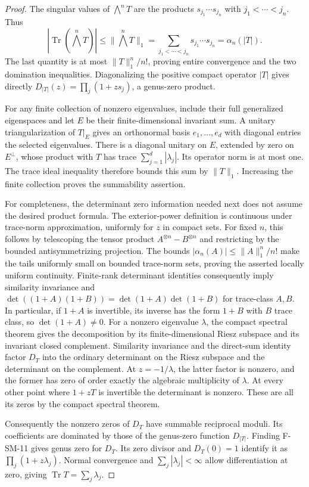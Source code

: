 \begin{proof}
The singular values of $\bigwedge^nT$ are the products
$s_{j_1}\cdots s_{j_n}$ with $j_1<\cdots<j_n$.  Thus
\[
 |\operatorname{Tr}(\bigwedge^nT)|
 \leq\|\bigwedge^nT\|_1
 =\sum_{j_1<\cdots<j_n}s_{j_1}\cdots s_{j_n}
 =\alpha_n(|T|).
\]
The last quantity is at most $\|T\|_1^n/n!$, proving entire convergence
and the two domination inequalities.  Diagonalizing the positive compact
operator $|T|$ gives directly
$D_{|T|}(z)=\prod_j(1+zs_j)$, a genus-zero product.

For any finite collection of nonzero eigenvalues, include their full
generalized eigenspaces and let $E$ be their finite-dimensional invariant
sum.  A unitary triangularization of $T|_E$ gives an orthonormal basis
$e_1,\ldots,e_d$ with diagonal entries the selected eigenvalues.  There is
a diagonal unitary on $E$, extended by zero on $E^\perp$, whose product
with $T$ has trace $\sum_{j=1}^d|\lambda_j|$.  Its operator norm is at
most one.  The trace ideal inequality therefore bounds this sum by
$\|T\|_1$.  Increasing the finite collection proves the summability
assertion.

For completeness, the determinant zero information needed next does not
assume the desired product formula.  The exterior-power definition is
continuous under trace-norm approximation, uniformly for $z$ in compact
sets.  For fixed $n$, this follows by telescoping the tensor product
$A^{\otimes n}-B^{\otimes n}$ and restricting by the bounded
antisymmetrizing projection.  The bounds
$|\alpha_n(A)|\leq\|A\|_1^n/n!$ make the tails uniformly small on
bounded trace-norm sets, proving the asserted locally uniform continuity.
Finite-rank determinant identities consequently imply similarity
invariance and
$\det((1+A)(1+B))=\det(1+A)\det(1+B)$ for trace-class $A,B$.
In particular, if $1+A$ is invertible, its inverse has the form $1+B$
with $B$ trace class, so $\det(1+A)\ne0$.
For a nonzero eigenvalue $\lambda$, the compact spectral theorem gives
the decomposition by its finite-dimensional Riesz subspace and its
invariant closed complement.  Similarity invariance and the direct-sum
identity factor $D_T$ into the ordinary determinant on the Riesz subspace
and the determinant on the complement.  At $z=-1/\lambda$, the latter
factor is nonzero, and the former has zero of order exactly the algebraic
multiplicity of $\lambda$.  At every other point where $1+zT$ is
invertible the determinant is nonzero.  These are all its zeros by the
compact spectral theorem.

Consequently the nonzero zeros of $D_T$ have summable reciprocal moduli.
Its coefficients are dominated by those of the genus-zero function
$D_{|T|}$.  Finding F-SM-11 gives genus zero for $D_T$.  Its zero divisor
and $D_T(0)=1$ identify it as $\prod_j(1+z\lambda_j)$.  Normal convergence
and $\sum_j|\lambda_j|<\infty$ allow differentiation at zero, giving
$\operatorname{Tr}T=\sum_j\lambda_j$.
\end{proof}

